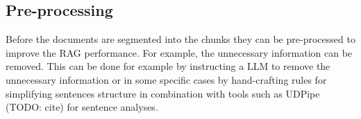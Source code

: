 \subsection{Pre-processing}

Before the documents are segmented into the chunks they can be pre-processed to improve the RAG performance. For example, the unnecessary information can be removed. This can be done for example by instructing a LLM to remove the unnecessary information or in some specific cases by hand-crafting rules for simplifying sentences structure in combination with tools such as UDPipe (TODO: cite) for sentence analyses.
